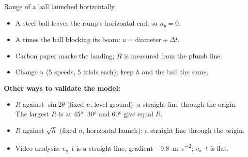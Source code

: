 \begin{experiment}{Range of a ball launched horizontally}
{\begin{sidebyside}[0.5]
  \label{ch1:fig:apparatus}
\nextside
  \begin{itemize}
    \item A steel ball leaves the ramp's horizontal end, so $u_y = 0$.
    \item A  times the ball blocking its beam: $u = \text{diameter} \div \Delta t$.
    \item Carbon paper marks the landing; $R$ is measured from the plumb line.
    \item Change $u$ (5 speeds, 5 trials each); keep $h$ and the ball the same.
  \end{itemize}
\end{sidebyside}}
\end{experiment}

\par\noindent\begin{minipage}{\linewidth}
\textbf{Other ways to validate the model:}
\begin{itemize}
  \item $R$ against $\sin 2\theta$ (fixed $u$, level ground): a straight line through the
        origin. The largest $R$ is at \ang{45}; \ang{30} and \ang{60} give equal $R$.
  \item $R$ against $\sqrt{h}$ (fixed $u$, horizontal launch): a straight line through the origin.
  \item Video analysis: $v_y$--$t$ is a straight line, gradient \qty{-9.8}{m.s^{-2}}; $v_x$--$t$ is flat.
\end{itemize}
\end{minipage}

